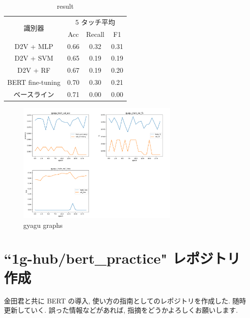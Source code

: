 \documentclass[twocolumn]{jarticle}     %
\begin{document}
\begin{table}[h]
\begin{center}
\caption{result}
\begin{tabular}{c|ccc}
\hline
\multirow{2}{*}{識別器} & \multicolumn{3}{c|}{5 タッチ平均} \\ \cline{2-4}
 & Acc & \multicolumn{1}{c}{Recall} & \multicolumn{1}{c}{F1} \\ \hline
D2V + MLP & \multicolumn{1}{l}{0.66} & 0.32 & 0.31 \\
D2V + SVM & \multicolumn{1}{l}{0.65} & 0.19 & 0.19 \\
D2V + RF & \multicolumn{1}{l}{0.67} & 0.19 & 0.20 \\
BERT fine-tuning & 0.70 & \multicolumn{1}{c}{0.30} & \multicolumn{1}{c}{0.21} \\ \hline
ベースライン & 0.71 & \multicolumn{1}{c}{0.00} & \multicolumn{1}{c}{0.00} \\ \hline
\end{tabular}
\label{tab:result}
\end{center}
\end{table}

\begin{figure}[h]
  \begin{center} %
    \includegraphics[width=8.0cm]{gyagu_res.png}
    \caption{gyagu graphs} %
    \label{fig:gyagu} %
  \end{center}
\end{figure}

\section{``1g-hub/bert\_practice" レポジトリ作成}

金田君と共に BERT の導入, 使い方の指南としてのレポジトリを作成した. 随時更新していく.
誤った情報などがあれば, 指摘をどうかよろしくお願いします.
\end{document}
